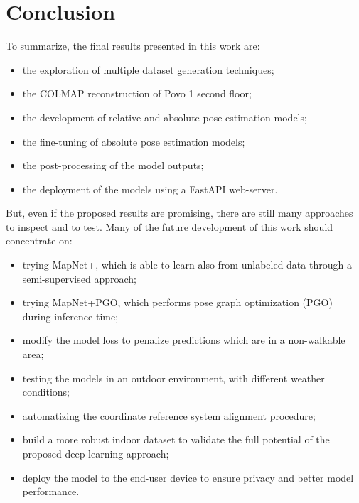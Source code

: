 \section{Conclusion}
To summarize, the final results presented in this work are:
\begin{itemize}
    \item the exploration of multiple dataset generation techniques;
    \item the COLMAP reconstruction of Povo 1 second floor;
    \item the development of relative and absolute pose estimation models;
    \item the fine-tuning of absolute pose estimation models;
    \item the post-processing of the model outputs;
    \item the deployment of the models using a FastAPI web-server. 
\end{itemize}

But, even if the proposed results are promising, there are still many approaches to inspect and to test.
Many of the future development of this work should concentrate on:
\begin{itemize}
    \item trying MapNet+, which is able to learn also from unlabeled data through a semi-supervised approach;
    \item trying MapNet+PGO, which performs pose graph optimization (PGO) during inference time;
    \item modify the model loss to penalize predictions which are in a non-walkable area;
    \item testing the models in an outdoor environment, with different weather conditions;
    \item automatizing the coordinate reference system alignment procedure;
    \item build a more robust indoor dataset to validate the full potential of the proposed deep learning approach;
    \item deploy the model to the end-user device to ensure privacy and better model performance.
\end{itemize}

